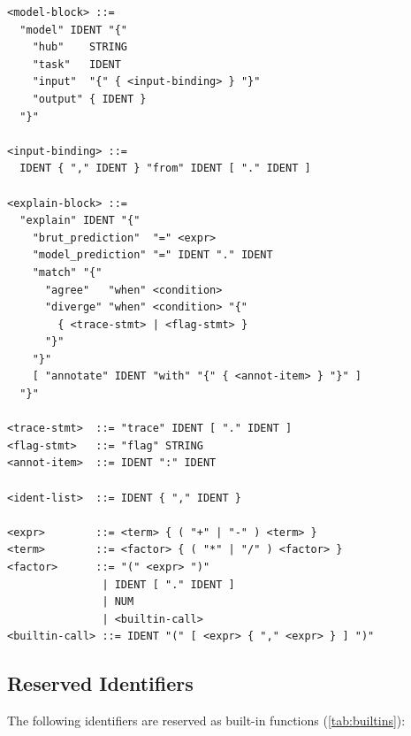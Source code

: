\documentclass[10pt,twocolumn,a4paper]{article}
\theoremstyle{definition}
\theoremstyle{remark}
\begin{document}
\begin{mdframed}[backgroundcolor=bg,linecolor=cm!40,linewidth=0.4pt]
\begin{verbatim}
<model-block> ::=
  "model" IDENT "{"
    "hub"    STRING
    "task"   IDENT
    "input"  "{" { <input-binding> } "}"
    "output" { IDENT }
  "}"

<input-binding> ::=
  IDENT { "," IDENT } "from" IDENT [ "." IDENT ]

<explain-block> ::=
  "explain" IDENT "{"
    "brut_prediction"  "=" <expr>
    "model_prediction" "=" IDENT "." IDENT
    "match" "{"
      "agree"   "when" <condition>
      "diverge" "when" <condition> "{"
        { <trace-stmt> | <flag-stmt> }
      "}"
    "}"
    [ "annotate" IDENT "with" "{" { <annot-item> } "}" ]
  "}"

<trace-stmt>  ::= "trace" IDENT [ "." IDENT ]
<flag-stmt>   ::= "flag" STRING
<annot-item>  ::= IDENT ":" IDENT

<ident-list>  ::= IDENT { "," IDENT }

<expr>        ::= <term> { ( "+" | "-" ) <term> }
<term>        ::= <factor> { ( "*" | "/" ) <factor> }
<factor>      ::= "(" <expr> ")"
               | IDENT [ "." IDENT ]
               | NUM
               | <builtin-call>
<builtin-call> ::= IDENT "(" [ <expr> { "," <expr> } ] ")"
\end{verbatim}
\end{mdframed}

\subsection{Reserved Identifiers}

The following identifiers are reserved as built-in functions
(\cref{tab:builtins}):
\end{document}
